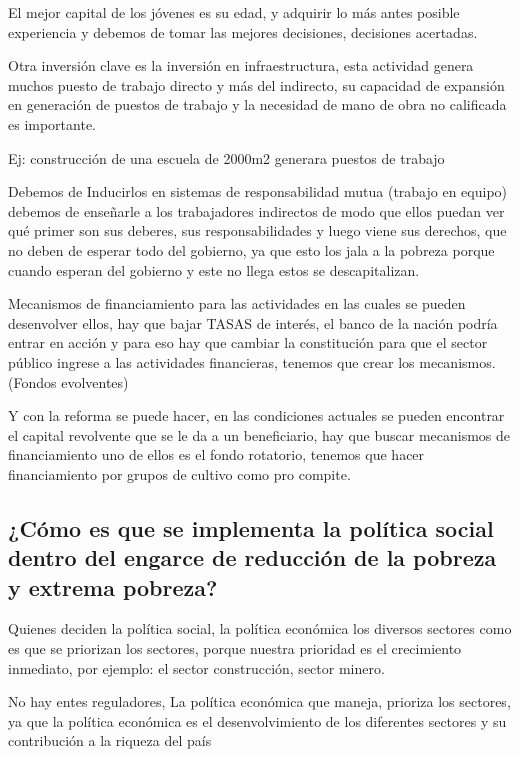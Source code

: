 \documentclass[
  a4paper,
]{article}
\begin{document}
El mejor capital de los jóvenes es su edad, y adquirir lo más antes
posible experiencia y debemos de tomar las mejores decisiones,
decisiones acertadas.

Otra inversión clave es la inversión en infraestructura, esta actividad
genera muchos puesto de trabajo directo y más del indirecto, su
capacidad de expansión en generación de puestos de trabajo y la
necesidad de mano de obra no calificada es importante.

Ej: construcción de una escuela de 2000m2 generara puestos de trabajo

Debemos de Inducirlos en sistemas de responsabilidad mutua (trabajo en
equipo) debemos de enseñarle a los trabajadores indirectos de modo que
ellos puedan ver qué primer son sus deberes, sus responsabilidades y
luego viene sus derechos, que no deben de esperar todo del gobierno, ya
que esto los jala a la pobreza porque cuando esperan del gobierno y este
no llega estos se descapitalizan.

Mecanismos de financiamiento para las actividades en las cuales se
pueden desenvolver ellos, hay que bajar TASAS de interés, el banco de la
nación podría entrar en acción y para eso hay que cambiar la
constitución para que el sector público ingrese a las actividades
financieras, tenemos que crear los mecanismos. (Fondos evolventes)

Y con la reforma se puede hacer, en las condiciones actuales se pueden
encontrar el capital revolvente que se le da a un beneficiario, hay que
buscar mecanismos de financiamiento uno de ellos es el fondo rotatorio,
tenemos que hacer financiamiento por grupos de cultivo como pro compite.

\hypertarget{cuxf3mo-es-que-se-implementa-la-poluxedtica-social-dentro-del-engarce-de-reducciuxf3n-de-la-pobreza-y-extrema-pobreza}{%
\subsection{¿Cómo es que se implementa la política social dentro del
engarce de reducción de la pobreza y extrema
pobreza?}\label{cuxf3mo-es-que-se-implementa-la-poluxedtica-social-dentro-del-engarce-de-reducciuxf3n-de-la-pobreza-y-extrema-pobreza}}

Quienes deciden la política social, la política económica los diversos
sectores como es que se priorizan los sectores, porque nuestra prioridad
es el crecimiento inmediato, por ejemplo: el sector construcción, sector
minero.

No hay entes reguladores, La política económica que maneja, prioriza los
sectores, ya que la política económica es el desenvolvimiento de los
diferentes sectores y su contribución a la riqueza del país
\end{document}
